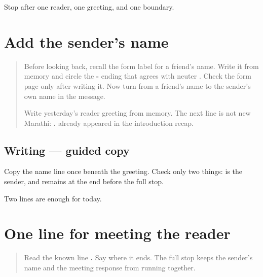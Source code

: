 \begin{tcolorbox}[breakable,colback=teal!4,colframe=teal!35!black,title={Before you move on}]
Stop after one reader, one greeting, and one boundary.
\end{tcolorbox}
\section[\texorpdfstring{\mr{माझं} \mr{नाव} \mr{अरुण} \mr{आहे}. (mājhaṁ nāv Aruṇ āhe)}{माझं नाव अरुण आहे. (mājhaṁ nāv Aruṇ āhe)}]{Add the sender's name}

\label{lesson:MR-A1M02-name-line}



\begin{quote}
Before looking back, recall the form label for a friend's name. Write it from memory and circle the \textbf{-} ending that agrees with neuter \textbf{}. Check the form page only after writing it. Now turn from a friend's name to the sender's own name in the message.

Write yesterday's reader greeting from memory. The next line is not new Marathi: \textbf{   .} already appeared in the introduction recap.
\end{quote}

\subsection*{Writing — guided copy}
Copy the name line once beneath the greeting. Check only two things: \textbf{} is the sender, and \textbf{} remains at the end before the full stop.

\begin{tcolorbox}[breakable,colback=teal!4,colframe=teal!35!black,title={Before you move on}]
Two lines are enough for today.
\end{tcolorbox}
\section[\texorpdfstring{\mr{भेटून} \mr{आनंद} \mr{झाला}. (bheṭūn ānand jhālā)}{भेटून आनंद झाला. (bheṭūn ānand jhālā)}]{One line for meeting the reader}

\label{lesson:MR-A1M03-meeting-line}



\begin{quote}
Read the known line \textbf{  .} Say where it ends. The full stop keeps the sender's name and the meeting response from running together.
\end{quote}

